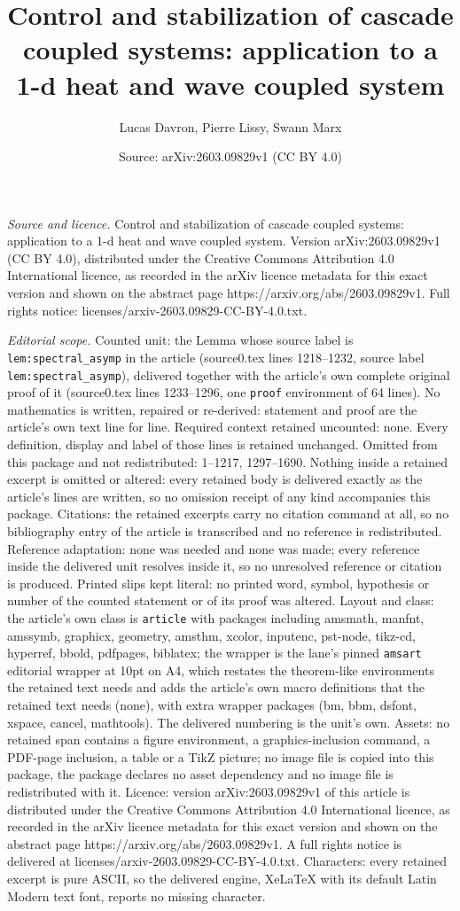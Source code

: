 \documentclass[10pt,a4paper]{amsart}
\title[Control and stabilization of cascade coupled systems: applic]{Control and stabilization of cascade coupled systems: application to a 1-d heat and wave coupled system}
\author{Lucas Davron, Pierre Lissy, Swann Marx}
\date{Source: arXiv:2603.09829v1 (CC BY 4.0)}
\begin{document}
\maketitle

\noindent\emph{Source and licence.} Control and stabilization of cascade coupled systems: application to a 1-d heat and wave coupled system. Version arXiv:2603.09829v1 (CC BY 4.0), distributed under the Creative Commons Attribution 4.0 International licence, as recorded in the arXiv licence metadata for this exact version and shown on the abstract page https://arxiv.org/abs/2603.09829v1. Full rights notice: licenses/arxiv-2603.09829-CC-BY-4.0.txt.\par\smallskip

\noindent\textit{Editorial scope.} Counted unit: the Lemma whose source label is \texttt{lem:spectral\_asymp} in the article (source0.tex lines 1218--1232, source label \texttt{lem:spectral\_asymp}), delivered together with the article's own complete original proof of it (source0.tex lines 1233--1296, one \texttt{proof} environment of 64 lines). No mathematics is written, repaired or re-derived: statement and proof are the article's own text line for line. Required context retained uncounted: none. Every definition, display and label of those lines is retained unchanged. Omitted from this package and not redistributed: 1--1217, 1297--1690. Nothing inside a retained excerpt is omitted or altered: every retained body is delivered exactly as the article's lines are written, so no omission receipt of any kind accompanies this package. Citations: the retained excerpts carry no citation command at all, so no bibliography entry of the article is transcribed and no reference is redistributed. Reference adaptation: none was needed and none was made; every reference inside the delivered unit resolves inside it, so no unresolved reference or citation is produced. Printed slips kept literal: no printed word, symbol, hypothesis or number of the counted statement or of its proof was altered. Layout and class: the article's own class is \texttt{article} with packages including amsmath, manfnt, amssymb, graphicx, geometry, amsthm, xcolor, inputenc, pst-node, tikz-cd, hyperref, bbold, pdfpages, biblatex; the wrapper is the lane's pinned \texttt{amsart} editorial wrapper at 10pt on A4, which restates the theorem-like environments the retained text needs and adds the article's own macro definitions that the retained text needs (none), with extra wrapper packages (bm, bbm, dsfont, xspace, cancel, mathtools). The delivered numbering is the unit's own. Assets: no retained span contains a figure environment, a graphics-inclusion command, a PDF-page inclusion, a table or a TikZ picture; no image file is copied into this package, the package declares no asset dependency and no image file is redistributed with it. Licence: version arXiv:2603.09829v1 of this article is distributed under the Creative Commons Attribution 4.0 International licence, as recorded in the arXiv licence metadata for this exact version and shown on the abstract page https://arxiv.org/abs/2603.09829v1. A full rights notice is delivered at licenses/arxiv-2603.09829-CC-BY-4.0.txt. Characters: every retained excerpt is pure ASCII, so the delivered engine, XeLaTeX with its default Latin Modern text font, reports no missing character.
\end{document}
